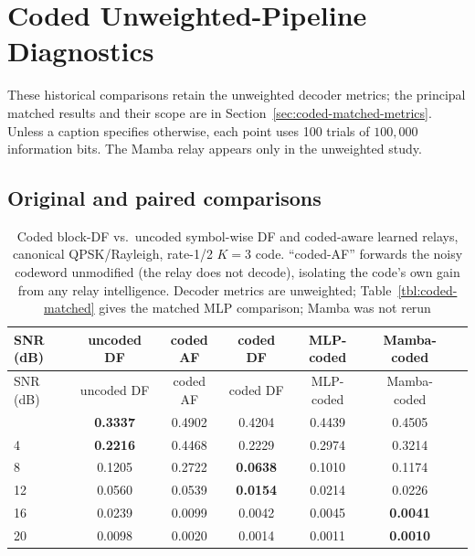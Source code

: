 \section{Coded Unweighted-Pipeline Diagnostics}\label{sec:appendix-coded-diagnostics}

These historical comparisons retain the unweighted decoder metrics; the principal matched results and their scope are in Section~\ref{sec:coded-matched-metrics}. Unless a caption specifies otherwise, each point uses 100 trials of $100{,}000$ information bits. The Mamba relay appears only in the unweighted study.

\subsection{Original and paired comparisons}

\begin{longtable}[]{@{}lcccccc@{}}
\caption[Coded block-DF vs.\ uncoded DF and coded-aware learned relays]{Coded block-DF vs.\ uncoded symbol-wise DF and coded-aware learned relays, canonical QPSK/Rayleigh, rate-1/2 $K{=}3$ code. ``coded-AF'' forwards the noisy codeword unmodified (the relay does not decode), isolating the code's own gain from any relay intelligence. Decoder metrics are unweighted; Table~\ref{tbl:coded-matched} gives the matched MLP comparison; Mamba was not rerun}\label{tbl:table34}\tabularnewline
\toprule\noalign{}
SNR (dB) & uncoded DF & coded AF & coded DF & MLP-coded & Mamba-coded \\
\midrule\noalign{}
\endfirsthead
\toprule\noalign{}
SNR (dB) & uncoded DF & coded AF & coded DF & MLP-coded & Mamba-coded \\
\midrule\noalign{}
\endhead
\bottomrule\noalign{}
\endlastfoot
0 & \textbf{0.3337} & 0.4902 & 0.4204 & 0.4439 & 0.4505 \\
4 & \textbf{0.2216} & 0.4468 & 0.2229 & 0.2974 & 0.3214 \\
8 & 0.1205 & 0.2722 & \textbf{0.0638} & 0.1010 & 0.1174 \\
12 & 0.0560 & 0.0539 & \textbf{0.0154} & 0.0214 & 0.0226 \\
16 & 0.0239 & 0.0099 & 0.0042 & 0.0045 & \textbf{0.0041} \\
20 & 0.0098 & 0.0020 & 0.0014 & 0.0011 & \textbf{0.0010} \\
\end{longtable}

